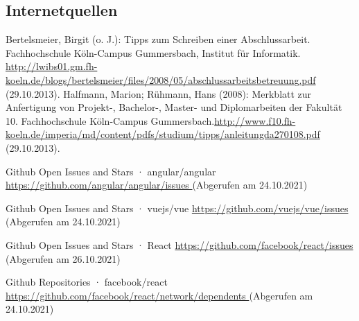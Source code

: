 \subsection{Internetquellen}
\begin{thebibliography}{HR08} %
  Bertelsmeier, Birgit (o. J.): Tipps zum Schrei\-b\-en ei\-n\-er Ab\-sch\-luss\-ar\-beit. Fach\-hoch\-schu\-le Köln-Campus Gummersbach, Institut für Informatik. \url{http://lwibs01.gm.fh-koeln.de/blogs/bertelsmeier/files/2008/05/abschlussarbeitsbetreuung.pdf} (29.10.2013).
   Halfmann, Marion; Rühmann, Hans (2008): Merkblatt zur Anfertigung von Projekt-, Bachelor-, Master- und Diplomarbeiten der Fakultät 10. Fachhochschule Köln-Campus Gummersbach.\url{http://www.f10.fh-koeln.de/imperia/md/content/pdfs/studium/tipps/anleitungda270108.pdf} (29.10.2013).

  Github Open Issues and Stars · angular/angular
  \url{ https://github.com/angular/angular/issues }
  (Abgerufen am 24.10.2021)

  Github Open Issues and Stars · vuejs/vue
  \url{ https://github.com/vuejs/vue/issues }
  (Abgerufen am 24.10.2021)

  Github Open Issues and Stars · React
  \url{https://github.com/facebook/react/issues }
  (Abgerufen am 26.10.2021)

  Github Repositories · facebook/react
  \url{ https://github.com/facebook/react/network/dependents }
  (Abgerufen am 24.10.2021)






\end{thebibliography}
